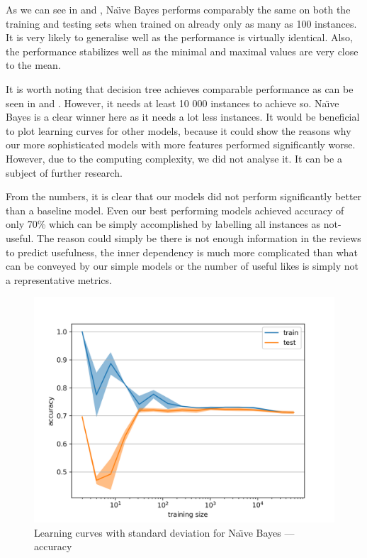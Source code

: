 As we can see in  and , Na\"{\i}ve Bayes performs comparably the same on both the training and testing sets when trained
on already only as many as 100 instances.
It is very likely to generalise well as the performance is virtually identical.
Also, the performance stabilizes well as the minimal and maximal values are very close to the mean.

It is worth noting that decision tree achieves comparable performance as can be seen in
 and .
However, it needs at least 10 000 instances to achieve so.
Na\"{\i}ve Bayes is a clear winner here as it needs a lot less instances.
It would be beneficial to plot learning curves for other models,
because it could show the reasons why our more sophisticated models with
more features performed significantly worse.
However, due to the computing complexity, we did not analyse it.
It can be a subject of further research.

From the numbers, it is clear that our models did not perform significantly better than 
a baseline model.
Even our best performing models achieved accuracy of only 70\% which can be simply accomplished by labelling all instances as not-useful.
The reason could simply be there is not enough information in the reviews to predict
 usefulness, the inner dependency is much more complicated than what can be conveyed by our simple models or the number of useful likes is simply not a representative metrics.



\begin{figure}[h]\centering
\includegraphics[width=130mm]{figures/lc2_acc.png}
\caption{Learning curves with standard deviation for Na\"{\i}ve Bayes --- accuracy}\label{fig:l_curves2_accuracy}
\end{figure}


